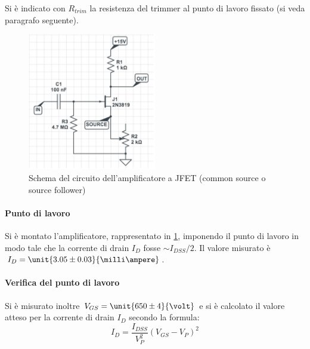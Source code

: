 \documentclass[10pt,a4paper]{article}
\begin{document}
Si è indicato con $R_{trim}$ la resistenza del trimmer al punto di lavoro fissato (si veda paragrafo seguente).

\begin{figure}[h!]
	\centering
	\includegraphics[width=0.5\textwidth]{../grafici/amplificatore.png}
	\caption{Schema del circuito dell'amplificatore a JFET (common source o source follower)}
	\label{fig:amplificatore}
\end{figure}

\paragraph{Punto di lavoro} Si è montato l'amplificatore, rappresentato in \figurename{\ref{fig:amplificatore}}, imponendo il punto di lavoro in modo tale che la corrente di drain $I_D$ fosse $\sim I_{DSS}/2$. Il valore misurato è $I_D = \unit{3.05 \pm 0.03}{\milli\ampere}$.


\paragraph{Verifica del punto di lavoro} Si è misurato inoltre $V_{GS} = \unit{650 \pm 4}{\volt}$ e si è calcolato il valore atteso per la corrente di drain $I_D$ secondo la formula:
\begin{equation*}
I_D = \frac{I_{DSS}}{V_P^2}(V_{GS} - V_P)^2
\end{equation*}
\end{document}
